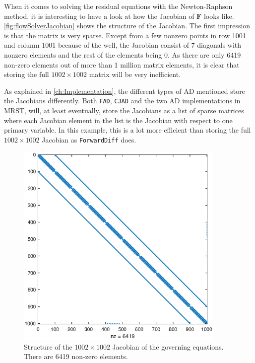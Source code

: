 When it comes to solving the residual equations with the Newton-Raphson method, it is interesting to have a look at how the Jacobian of $\boldsymbol{F}$ looks like. \autoref{fig:flowSolverJacobian} shows the structure of the Jacobian. The first impression is that the matrix is very sparse. Except from a few nonzero points in row 1001 and column 1001 because of the well, the Jacobian consist of 7 diagonals with nonzero elements and the rest of the elements being 0. As there are only 6419 non-zero elements out of more than 1 million matrix elements, it is clear that storing the full $1002\times 1002$ matrix will be very inefficient.

As explained in \autoref{ch:Implementation}, the different types of AD mentioned store the Jacobians differently. Both \texttt{FAD}, \texttt{CJAD} and the two AD implementations in MRST, will, at least eventually, store the Jacobians as a list of sparse matrices where each Jacobian element in the list is the Jacobian with respect to one primary variable. In this example, this is a lot more efficient than storing the full $1002\times 1002$ Jacobian as  \texttt{ForwardDiff} does.
\begin{figure}[H]
    \centering
    \includegraphics[width = 0.9\textwidth]{figures/flowSolver_Jacobian.eps}
    \caption{Structure of the $1002\times 1002$ Jacobian of the governing equations. There are 6419 non-zero elements.}
    \label{fig:flowSolverJacobian}
\end{figure}


